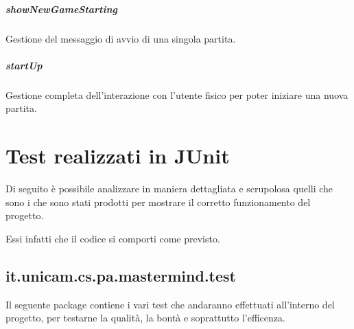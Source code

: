 \documentclass[letterpaper,10pt,italian,openany,oneside]{sphinxmanual}
\begin{document}
\paragraph{showNewGameStarting}
\label{\detokenize{source/it/unicam/cs/pa/mastermind/ui/StartView:shownewgamestarting}}

\begin{fulllineitems}
\label{\detokenize{source/it/unicam/cs/pa/mastermind/ui/StartView:it.unicam.cs.pa.mastermind.ui.StartView.showNewGameStarting()}}
Gestione del messaggio di avvio di una singola partita.

\end{fulllineitems}



\paragraph{startUp}
\label{\detokenize{source/it/unicam/cs/pa/mastermind/ui/StartView:startup}}

\begin{fulllineitems}
\label{\detokenize{source/it/unicam/cs/pa/mastermind/ui/StartView:it.unicam.cs.pa.mastermind.ui.StartView.startUp()}}
Gestione completa dell’interazione con l’utente fisico per poter iniziare una nuova partita.

\end{fulllineitems}



\chapter{Test realizzati in JUnit}
\label{\detokenize{test/packages:test-realizzati-in-junit}}\label{\detokenize{test/packages::doc}}
Di seguito è possibile analizzare in maniera dettagliata e scrupolosa quelli che sono
i  che sono stati prodotti per mostrare il corretto funzionamento del progetto.

Essi infatti  che il codice si comporti come previsto.


\section{it.unicam.cs.pa.mastermind.test}
\label{\detokenize{test/it/unicam/cs/pa/mastermind/test/package-index:it-unicam-cs-pa-mastermind-test}}\label{\detokenize{test/it/unicam/cs/pa/mastermind/test/package-index::doc}}
Il seguente package contiene i vari test che andaranno effettuati all’interno del progetto, per testarne la qualità, la bontà e soprattutto l’efficenza.
\end{document}
